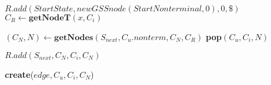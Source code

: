 \begin{algorithmic}
    \State $R.add(StartState, new GSSnode(StartNonterminal,0), 0, \$)$
            \State $C_{R} \gets \textbf{getNodeT}(x, C_{i})$
            
                        
            \State $(C_{N}, N) \gets \textbf{getNodes}(S_{next},C_{u}.nonterm, C_{N}, C_{R})$
                \State \textbf{pop}$(C_{u},C_{i},N)$ 
            \EndIf
            
                \State $R.add(S_{next}, C_{N}, C_{i}, C_{N})$
            \EndIf
            
        \EndCase
    
            \State \textbf{create}($edge,  C_{u}, C_{i}, C_{N}$)
        \EndCase
        \EndSwitch
        
    \EndFor
    \EndWhile
\EndFunction
\end{algorithmic}